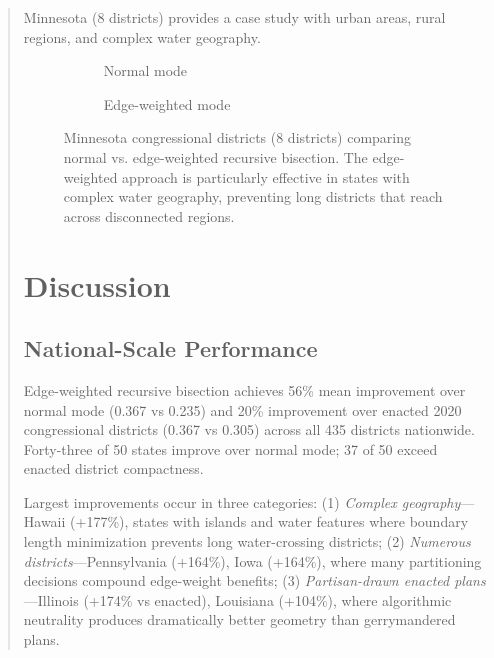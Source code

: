 \documentclass[11pt,twocolumn]{article}
\begin{document}
\begin{abstract}
Minnesota (8 districts) provides a case study with urban areas, rural regions, and complex water geography.

\begin{figure}[t]
\centering
\begin{subfigure}[b]{0.48\textwidth}
    \centering
    \caption{Normal mode}
\end{subfigure}
\hfill
\begin{subfigure}[b]{0.48\textwidth}
    \centering
    \caption{Edge-weighted mode}
\end{subfigure}
\caption{Minnesota congressional districts (8 districts) comparing normal vs. edge-weighted recursive bisection. The edge-weighted approach is particularly effective in states with complex water geography, preventing long districts that reach across disconnected regions.}
\label{fig:minnesota-comparison}
\end{figure}

\section{Discussion}

\subsection{National-Scale Performance}

Edge-weighted recursive bisection achieves 56\% mean improvement over normal mode (0.367 vs 0.235) and 20\% improvement over enacted 2020 congressional districts (0.367 vs 0.305) across all 435 districts nationwide. Forty-three of 50 states improve over normal mode; 37 of 50 exceed enacted district compactness.

Largest improvements occur in three categories: (1) \textit{Complex geography}---Hawaii (+177\%), states with islands and water features where boundary length minimization prevents long water-crossing districts; (2) \textit{Numerous districts}---Pennsylvania (+164\%), Iowa (+164\%), where many partitioning decisions compound edge-weight benefits; (3) \textit{Partisan-drawn enacted plans}---Illinois (+174\% vs enacted), Louisiana (+104\%), where algorithmic neutrality produces dramatically better geometry than gerrymandered plans.


\end{abstract}
\end{document}
